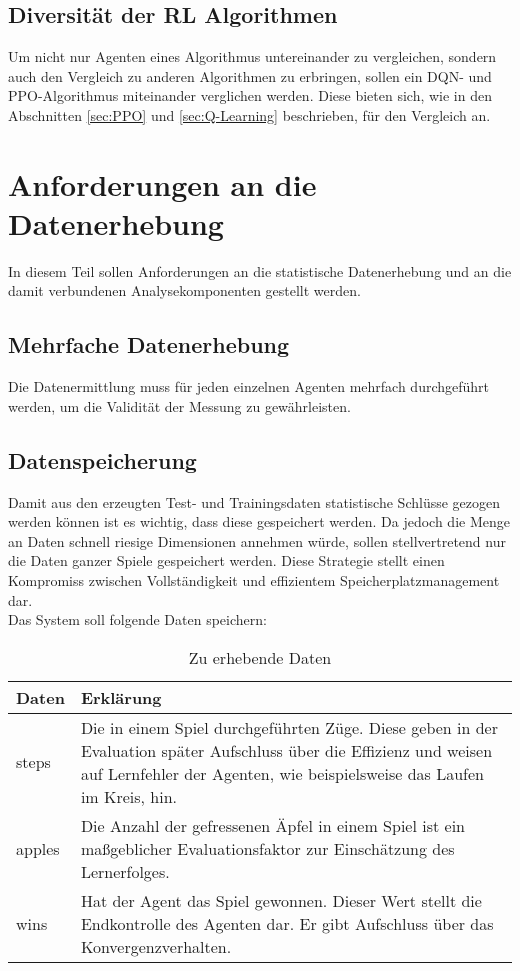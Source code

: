 \subsection{Diversität der RL Algorithmen}
Um nicht nur Agenten eines Algorithmus untereinander zu vergleichen, sondern auch den Vergleich zu anderen Algorithmen zu erbringen, sollen ein DQN- und PPO-Algorithmus miteinander verglichen werden. 
Diese bieten sich, wie in den Abschnitten \ref{sec:PPO} und \ref{sec:Q-Learning} beschrieben, für den Vergleich an.

\section{Anforderungen an die Datenerhebung} \label{sec:Anforderungen_an_die_Datenerhebung}
In diesem Teil sollen Anforderungen an die statistische Datenerhebung und an die damit verbundenen Analysekomponenten gestellt werden.

\subsection{Mehrfache Datenerhebung}
Die Datenermittlung muss für jeden einzelnen Agenten mehrfach durchgeführt werden, um die Validität der Messung zu gewährleisten.

\subsection{Datenspeicherung}
Damit aus den erzeugten Test- und Trainingsdaten statistische Schlüsse gezogen werden können ist es wichtig, dass diese gespeichert werden. Da jedoch die Menge an Daten schnell riesige Dimensionen annehmen würde, sollen stellvertretend nur die Daten ganzer Spiele gespeichert werden. Diese Strategie stellt einen Kompromiss zwischen Vollständigkeit und effizientem Speicherplatzmanagement dar.\\
Das System soll folgende Daten speichern:
\begin{longtable}[h]{|p{4cm}|p{\linewidth - 5cm}|}
	\caption{Zu erhebende Daten}
	\label{tab:Datenerhebung} 
	\endfirsthead
	\endhead
	\hline
	Daten & Erklärung \\
	\hline
	steps & Die in einem Spiel durchgeführten Züge. Diese geben in der Evaluation später Aufschluss über die Effizienz und weisen auf Lernfehler der Agenten, wie beispielsweise das Laufen im Kreis, hin.\\
	\hline
	apples & Die Anzahl der gefressenen Äpfel in einem Spiel ist ein maßgeblicher Evaluationsfaktor zur Einschätzung des Lernerfolges.\\
	\hline
	wins & Hat der Agent das Spiel gewonnen. Dieser Wert stellt die Endkontrolle des Agenten dar. Er gibt Aufschluss über das Konvergenzverhalten.\\
	\hline
\end{longtable}

